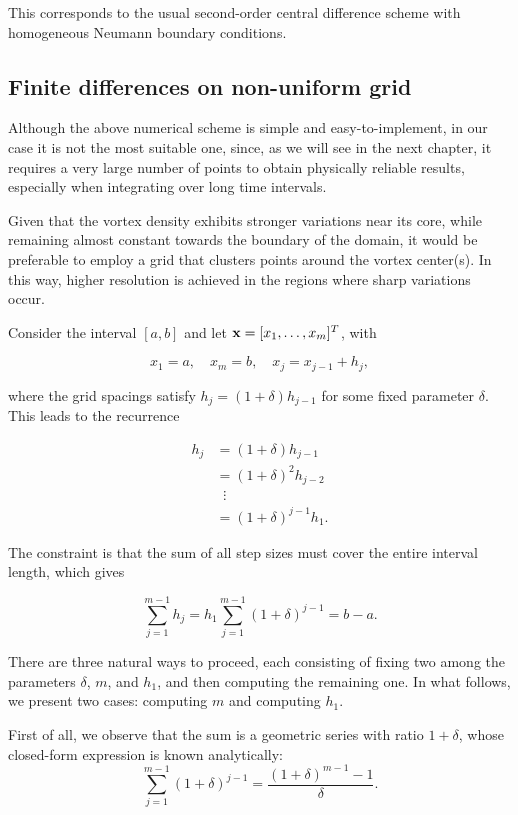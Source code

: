 This corresponds to the usual second-order central difference scheme with homogeneous Neumann boundary conditions. 

\subsection{Finite differences on non-uniform grid}
\label{sb:nufg}

Although the above numerical scheme is simple and easy-to-implement, in our case it is not the most suitable one, since, as we will see in the next chapter, it requires a very large number of points to obtain physically reliable results, especially when integrating over long time intervals.  

Given that the vortex density exhibits stronger variations near its core, while remaining almost constant towards the boundary of the domain, it would be preferable to employ a grid that clusters points around the vortex center(s). 
In this way, higher resolution is achieved in the regions where sharp variations occur.

Consider the interval $[a,b]$ and let $\mathbf{x} = [x_1, \dots, x_m]^T$, with 

\[
    x_1 = a, \quad x_m = b, \quad x_j = x_{j-1} + h_j,
\]

where the grid spacings satisfy $h_j = (1 + \delta) h_{j-1}$ for some fixed parameter $\delta$.  
This leads to the recurrence

\begin{align*}
    h_j &= (1 + \delta) h_{j-1} \\
        &= (1 + \delta)^2 h_{j-2} \\
        &\;\;\vdots \\
        &= (1 + \delta)^{j-1} h_1.
\end{align*}

The constraint is that the sum of all step sizes must cover the entire interval length, which gives

\[
    \sum_{j=1}^{m-1} h_j
    = h_1 \sum_{j=1}^{m-1} (1+\delta)^{j-1} 
    = b-a.
\]

There are three natural ways to proceed, each consisting of fixing two among the parameters $\delta$, $m$, and $h_1$, and then computing the remaining one.  
In what follows, we present two cases: computing $m$ and computing $h_1$.

First of all, we observe that the sum is a geometric series with ratio $1+\delta$, whose closed-form expression is known analytically:  
\[
    \sum_{j=1}^{m-1} (1+\delta)^{j-1} = \frac{(1+\delta)^{m-1} - 1}{\delta}.
\]

